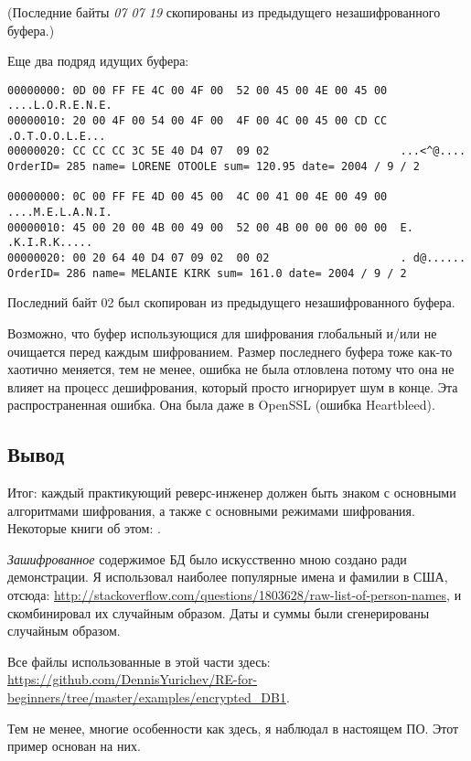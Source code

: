 (Последние байты \emph{07 07 19} скопированы из предыдущего незашифрованного буфера.)

Еще два подряд идущих буфера:

\begin{lstlisting}
00000000: 0D 00 FF FE 4C 00 4F 00  52 00 45 00 4E 00 45 00  ....L.O.R.E.N.E.
00000010: 20 00 4F 00 54 00 4F 00  4F 00 4C 00 45 00 CD CC   .O.T.O.O.L.E...
00000020: CC CC CC 3C 5E 40 D4 07  09 02                    ...<^@....
OrderID= 285 name= LORENE OTOOLE sum= 120.95 date= 2004 / 9 / 2

00000000: 0C 00 FF FE 4D 00 45 00  4C 00 41 00 4E 00 49 00  ....M.E.L.A.N.I.
00000010: 45 00 20 00 4B 00 49 00  52 00 4B 00 00 00 00 00  E. .K.I.R.K.....
00000020: 00 20 64 40 D4 07 09 02  00 02                    . d@......
OrderID= 286 name= MELANIE KIRK sum= 161.0 date= 2004 / 9 / 2
\end{lstlisting}

Последний байт 02 был скопирован из предыдущего незашифрованного буфера.

Возможно, что буфер использующися для шифрования глобальный и/или не очищается перед каждым шифрованием.
Размер последнего буфера тоже как-то хаотично меняется, тем не менее, ошибка не была отловлена потому что она не влияет
на процесс дешифрования, который просто игнорирует шум в конце.
Эта распространенная ошибка.
Она была даже в OpenSSL (ошибка Heartbleed).

\subsection{Вывод}

Итог:
каждый практикующий реверс-инженер должен быть знаком с основными алгоритмами шифрования, а также с основными режимами
шифрования.
Некоторые книги об этом: .

\emph{Зашифрованное} содержимое БД было искусственно мною создано ради демонстрации.
Я использовал наиболее популярные имена и фамилии в США, отсюда: \url{http://stackoverflow.com/questions/1803628/raw-list-of-person-names},
и скомбинировал их случайным образом.
Даты и суммы были сгенерированы случайным образом.

Все файлы использованные в этой части здесь:
\url{https://github.com/DennisYurichev/RE-for-beginners/tree/master/examples/encrypted_DB1}.

Тем не менее, многие особенности как здесь, я наблюдал в настоящем ПО.
Этот пример основан на них.

